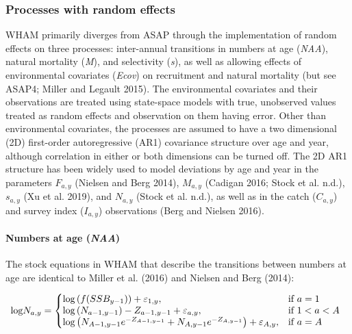\documentclass[]{article}
\let\oldparagraph\paragraph
\renewcommand{\paragraph}[1]{\oldparagraph{#1}\mbox{}}
\begin{document}
\hypertarget{processes-with-random-effects}{%
\subsubsection{Processes with random
effects}\label{processes-with-random-effects}}

WHAM primarily diverges from ASAP through the implementation of random
effects on three processes: inter-annual transitions in numbers at age
(\emph{NAA}), natural mortality (\emph{M}), and selectivity (\emph{s}),
as well as allowing effects of environmental covariates (\emph{Ecov}) on
recruitment and natural mortality (but see ASAP4; Miller and Legault
2015). The environmental covariates and their observations are treated
using state-space models with true, unobserved values treated as random
effects and observation on them having error. Other than environmental
covariates, the processes are assumed to have a two dimensional (2D)
first-order autoregressive (AR1) covariance structure over age and year,
although correlation in either or both dimensions can be turned off. The
2D AR1 structure has been widely used to model deviations by age and
year in the parameters \(F_{a,y}\) (Nielsen and Berg 2014), \(M_{a,y}\)
(Cadigan 2016; Stock et al. n.d.), \(s_{a,y}\) (Xu et al. 2019), and
\(N_{a,y}\) (Stock et al. n.d.), as well as in the catch (\(C_{a,y}\))
and survey index (\(I_{a,y}\)) observations (Berg and Nielsen 2016).

\hypertarget{numbers-at-age-naa}{%
\paragraph{\texorpdfstring{Numbers at age
(\emph{NAA})}{Numbers at age (NAA)}}\label{numbers-at-age-naa}}

The stock equations in WHAM that describe the transitions between
numbers at age are identical to Miller et al. (2016) and Nielsen and
Berg (2014):

\begin{equation}
\label{eq:NAA}
  \text{log}N_{a,y}=\left\{
    \begin{array}{@{}lll@{}}
      \text{log} \left( f(SSB_{y-1}) \right) + \varepsilon_{1,y}, & \text{if}\ a = 1 \\
      \text{log} \left( N_{a-1,y-1} \right) - Z_{a-1,y-1} + \varepsilon_{a,y}, & \text{if}\ 1 < a < A \\
      \text{log} \left( N_{A-1,y-1} e^{-Z_{A-1,y-1}} + N_{A,y-1} e^{-Z_{A,y-1}} \right) + \varepsilon_{A,y}, & \text{if}\ a = A
    \end{array}\right.
\end{equation}
\end{document}

